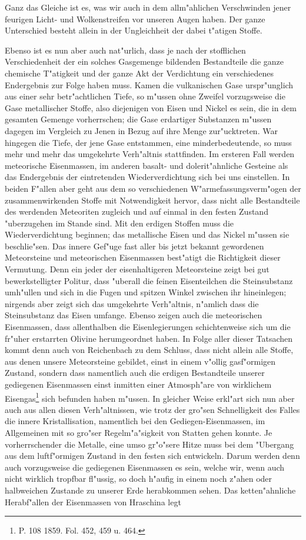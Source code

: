 \documentclass[a4paper, 8pt, oneside, polutonikogreek, german]{article}
\begin{document}
Ganz das Gleiche ist es, was wir auch in dem allm"ahlichen Verschwinden jener feurigen Licht- und Wolkenstreifen vor unseren Augen haben. Der ganze Unterschied besteht allein in der Ungleichheit der dabei t"atigen Stoffe.

Ebenso ist es nun aber auch nat"urlich, dass je nach der stofflichen Verschiedenheit der ein solches Gasgemenge bildenden Bestandteile die ganze chemische T"atigkeit und der ganze Akt der Verdichtung ein verschiedenes Endergebnis zur Folge haben muss. Kamen die vulkanischen Gase urspr"unglich aus einer sehr betr"achtlichen Tiefe, so m"ussen ohne Zweifel vorzugsweise die Gase metallischer Stoffe, also diejenigen von Eisen und Nickel es sein, die in dem gesamten Gemenge vorherrschen; die Gase erdartiger Substanzen m"ussen dagegen im Vergleich zu Jenen in Bezug auf ihre Menge zur"ucktreten. War hingegen die Tiefe, der jene Gase entstammen, eine minderbedeutende, so muss mehr und mehr das umgekehrte Verh"altnis stattfinden. Im ersteren Fall werden meteorische Eisenmassen, im anderen basalt- und dolerit"ahnliche Gesteine als das Endergebnis der eintretenden Wiederverdichtung sich bei uns einstellen. In beiden F"allen aber geht aus dem so verschiedenen W"armefassungsverm"ogen der zusammenwirkenden Stoffe mit Notwendigkeit hervor, dass nicht alle Bestandteile des werdenden Meteoriten zugleich und auf einmal in den festen Zustand "uberzugehen im Stande sind. Mit den erdigen Stoffen muss die Wiederverdichtung beginnen; das metallische Eisen und das Nickel m"ussen sie beschlie"sen. Das innere Gef"uge fast aller bis jetzt bekannt gewordenen Meteorsteine und meteorischen Eisenmassen best"atigt die Richtigkeit dieser Vermutung. Denn ein jeder der eisenhaltigeren Meteorsteine zeigt bei gut bewerkstelligter Politur, dass "uberall die feinen Eisenteilchen die Steinsubstanz umh"ullen und sich in die Fugen und spitzen Winkel zwischen ihr hineinlegen; nirgends aber zeigt sich das umgekehrte Verh"altnis, n"amlich dass die Steinsubstanz das Eisen umfange. Ebenso zeigen auch die meteorischen Eisenmassen, dass allenthalben die Eisenlegierungen schichtenweise sich um die fr"uher erstarrten Olivine herumgeordnet haben. In Folge aller dieser Tatsachen kommt denn auch von Reichenbach zu dem Schluss, dass nicht allein alle Stoffe, aus denen unsere Meteorsteine gebildet, einst in einem v"ollig gasf"ormigen Zustand, sondern dass namentlich auch die erdigen Bestandteile unserer gediegenen Eisenmassen einst inmitten einer Atmosph"are von wirklichem Eisengas\footnote{P. 108 1859. Fol. 452, 459 u. 464.} sich befunden haben m"ussen. In gleicher Weise erkl"art sich nun aber auch aus allen diesen Verh"altnissen, wie trotz der gro"sen Schnelligkeit des Falles die innere Kristallisation, namentlich bei den Gediegen-Eisenmassen, im Allgemeinen mit so gro"ser Regelm"a"sigkeit von Statten gehen konnte. Je vorherrschender die Metalle, eine umso gr"o"sere Hitze muss bei dem "Ubergang aus dem luftf"ormigen Zustand in den festen sich entwickeln. Darum werden denn auch vorzugsweise die gediegenen Eisenmassen es sein, welche wir, wenn auch nicht wirklich tropfbar fl"ussig, so doch h"aufig in einem noch z"ahen oder halbweichen Zustande zu unserer Erde herabkommen sehen. Das ketten"ahnliche Herabf"allen der Eisenmassen von Hraschina legt 
\end{document}
